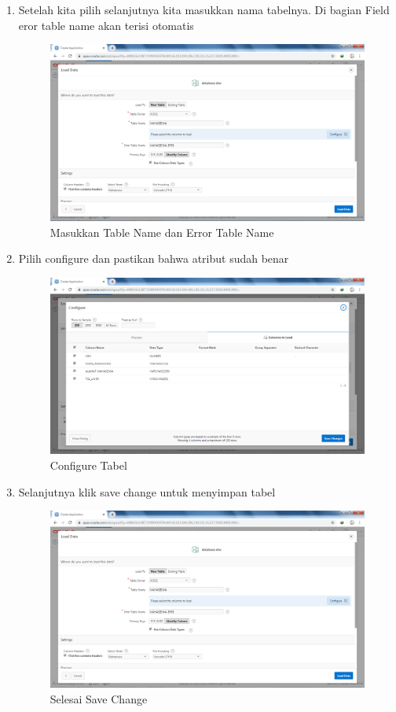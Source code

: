 \begin{enumerate}
\item Setelah kita pilih selanjutnya kita masukkan nama tabelnya. Di bagian Field eror table name akan terisi otomatis
\begin{figure}[H]
\centering
\caption{Masukkan Table Name dan Error Table Name}
\includegraphics[width=1\textwidth]{figures/6.png}
\end{figure}

\item Pilih configure dan pastikan bahwa atribut sudah benar
\begin{figure}[H]
\centering
\caption{Configure Tabel}
\includegraphics[width=1\textwidth]{figures/7.png}
\end{figure}

\item Selanjutnya klik save change untuk menyimpan tabel
\begin{figure}[H]
\centering
\caption{Selesai Save Change}
\includegraphics[width=1\textwidth]{figures/6.png}
\end{figure}


\end{enumerate}
